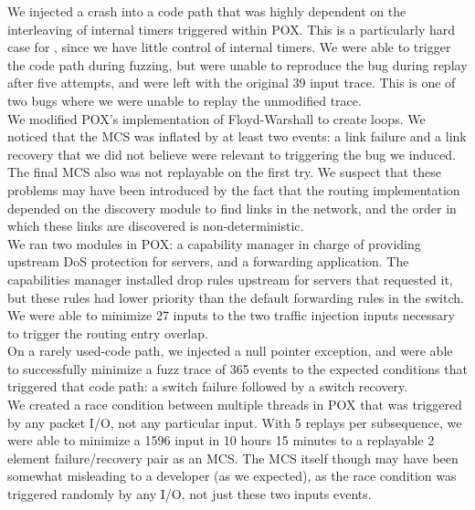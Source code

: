 We injected a crash into a code path that was highly dependent on the
interleaving of internal timers triggered within POX. This is a particularly
hard case for \projectname, since we have little control of internal timers.
We were able to trigger the code path during fuzzing, but were unable to
reproduce the bug during replay after five attempts, and were left with the
original 39 input trace. This is one of two bugs where we were
unable to replay the unmodified trace.\\[0.5ex]
%
We modified POX's implementation of Floyd-Warshall to create loops.
We noticed that the MCS was inflated by at least two events: a link failure
and a link recovery that we did not believe were relevant to triggering the bug we
induced. The final MCS also was not replayable on the first try.
We suspect that these problems may have been introduced by the fact that the
routing implementation depended on the discovery module to find links in the
network, and the order in which these links are discovered is
non-deterministic.\\[0.5ex]
%
We ran two modules in POX: a capability manager in charge of providing
upstream DoS protection for servers, and a forwarding application. The
capabilities manager installed drop rules upstream for servers that requested
it, but these rules had lower priority than the default forwarding rules in
the switch. We were able to minimize 27 inputs to the two traffic injection
inputs necessary to trigger the routing entry overlap.\\[0.5ex]
%
On a rarely used-code path, we injected a null pointer exception,
and were able to successfully minimize a fuzz trace of 365 events to the
expected conditions that triggered that code path: a switch failure followed
by a switch recovery.\\[0.5ex]
%
We created a race condition between multiple threads in POX that was
triggered by any packet I/O, not any particular input. With 5 replays per
subsequence, we were able to minimize a 1596 input in 10 hours 15 minutes to a
replayable 2 element failure/recovery pair as an MCS.
The MCS itself though may have been somewhat misleading to a developer (as
we expected), as the race condition
was triggered randomly by any I/O, not just these two
inputs events.\\[0.5ex]
%
